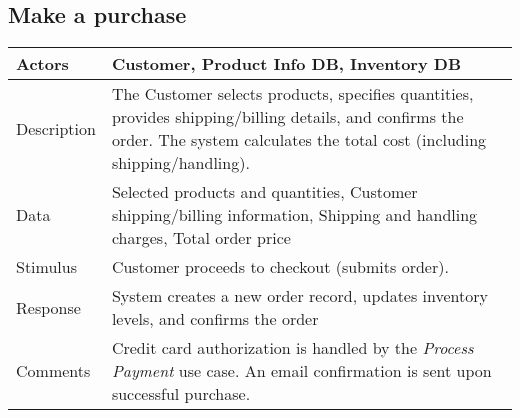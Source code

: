 \documentclass{report}
\begin{document}
    \subsection{Make a purchase}
    \begin{center}
        \begin{tabular}{|p{5cm}|p{8cm}|}
            \hline
            Actors & 
            Customer, Product Info DB, Inventory DB \\
            \hline
            Description & 
            The Customer selects products, specifies quantities, provides 
            shipping/billing details, and confirms the order. The system 
            calculates the total cost (including shipping/handling). \\
            \hline
            Data & 
            Selected products and quantities, Customer shipping/billing information, Shipping and handling charges, Total order price \\
            \hline
            Stimulus & 
            Customer proceeds to checkout (submits order). \\
            \hline
            Response & 
            System creates a new order record, updates inventory levels, 
            and confirms the order \\
            \hline
            Comments & 
            Credit card authorization is handled by the \emph{Process Payment} 
            use case. An email confirmation is sent upon successful purchase. \\
            \hline
        \end{tabular}
    \end{center}
    

    \pagebreak 
\end{document}
